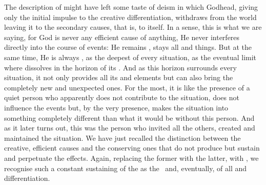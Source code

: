 

\label{adopenness}
The description of  might have 
left some taste of deism in which Godhead, giving only the initial
impulse to the creative differentiation, withdraws from the world leaving it
to the secondary causes, that is, to itself. In a sense, this is what we are saying,
for God is never any 
 efficient cause of anything, He never interferes directly into the
course of  events: He remains , stays  all
 and  things. But at the same time, He is always
, as the deepest  of every situation, as the eventual
limit where  dissolves in the  horizon of its
. And as this horizon surrounds every situation, it not only
provides all its  and  elements but  can also
bring the completely new and unexpected ones.
For the most, it is like the presence of a quiet person who apparently
does not contribute to the situation, does not influence the events but, by the
very presence, makes the situation into something completely different than what
it would be without this person. And as it later turns out, this was the person
who invited all the others, created and maintained the situation. We have just
recalled the distinction between the creative, efficient causes 
and the conserving ones that do not produce but sustain and perpetuate the
effects. Again, replacing the former with
the latter,  with , we recognise such a constant
sustaining  of the  as the  \hoa\ and,
eventually, of all  and differentiation.

